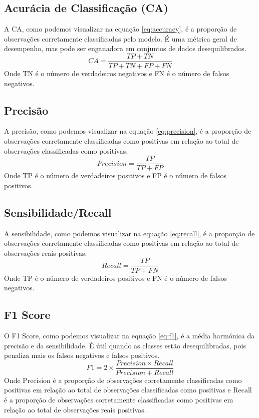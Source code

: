 \documentclass[conference]{IEEEtran}
\begin{document}
\subsection{Acurácia de Classificação (CA)}
A CA, como podemos visualizar na equação \ref{eq:accuracy}, é a proporção de observações corretamente classificadas pelo modelo. É uma métrica geral de desempenho, mas pode ser enganadora em conjuntos de dados
desequilibrados.
\begin{equation}
	CA = \frac{TP + TN}{TP + TN + FP + FN}
	\label{eq:accuracy}
\end{equation}
Onde TN é o número de verdadeiros negativos e FN é o número de falsos negativos.
\subsection{Precisão}
A precisão, como podemos visualizar na equação \ref{eq:precision}, é a proporção de observações corretamente classificadas como positivas em relação ao total de observações classificadas como positivas.
\begin{equation}
	Precision = \frac{TP}{TP + FP}
	\label{eq:precision}
\end{equation}
Onde TP é o número de verdadeiros positivos e FP é o número de falsos positivos.
\subsection{Sensibilidade/Recall}
A sensibilidade, como podemos visualizar na equação \ref{eq:recall}, é a proporção de observações corretamente classificadas como positivas em relação ao total de observações reais positivas.
\begin{equation}
	Recall = \frac{TP}{TP + FN}
	\label{eq:recall}
\end{equation}
Onde TP é o número de verdadeiros positivos e FN é o número de falsos negativos.

\subsection{F1 Score}
O F1 Score, como podemos visualizar na equação \ref{eq:f1}, é a média harmónica da precisão e da sensibilidade. É útil quando as classes estão desequilibradas, pois penaliza mais os falsos negativos e
falsos positivos.
\begin{equation}
	F1 = 2 \times \frac{Precision \times Recall}{Precision + Recall}
	\label{eq:f1}
\end{equation}
Onde Precision é a proporção de observações corretamente classificadas como positivas em relação ao total de observações classificadas como positivas e Recall
é a proporção de observações corretamente classificadas como positivas em relação ao total de observações reais positivas.
\end{document}
